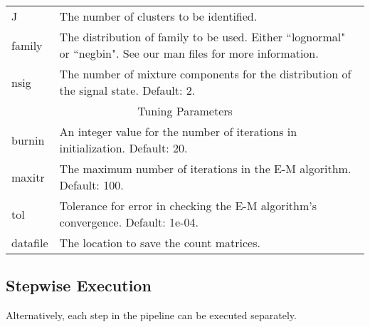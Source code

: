 \documentclass[a4paper,10pt]{article}
\begin{document}
\begin{table}
\begin{tabular}{p{2cm}p{10cm}}
    J & The number of clusters to be identified.\\
    family & The distribution of family to be used.  Either ``lognormal" or ``negbin". See our man files for more information.\\
    nsig & The number of mixture components for the distribution of the signal state. Default: 2.\\
    \hline
    \multicolumn{2}{c}{Tuning Parameters}\\
    \hline
    burnin & An integer value for the number of iterations in initialization. Default: 20.\\
    maxitr & The maximum number of iterations in the E-M algorithm. Default: 100.\\
    tol & Tolerance for error in checking the E-M algorithm's convergence. Default: 1e-04.\\
    datafile & The location to save the count matrices.\\
    \hline
  \end{tabular}
\end{table}

\subsection{Stepwise Execution}

Alternatively, each step in the pipeline can be executed separately.

\begin{Schunk}
\end{Schunk}
\end{document}
